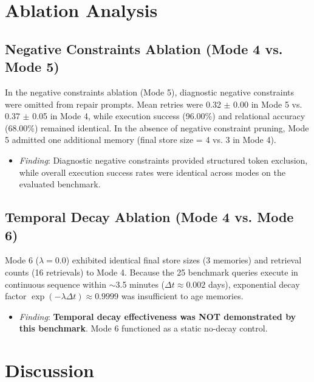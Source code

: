 \documentclass[conference]{IEEEtran}
\begin{document}
\section{Ablation Analysis}

\subsection{Negative Constraints Ablation (Mode 4 vs. Mode 5)}
In the negative constraints ablation (Mode 5), diagnostic negative constraints were omitted from repair prompts. Mean retries were 0.32 $\pm$ 0.00 in Mode 5 vs. 0.37 $\pm$ 0.05 in Mode 4, while execution success (96.00\%) and relational accuracy (68.00\%) remained identical. In the absence of negative constraint pruning, Mode 5 admitted one additional memory (final store size = 4 vs. 3 in Mode 4).
\begin{itemize}
    \item \textit{Finding}: Diagnostic negative constraints provided structured token exclusion, while overall execution success rates were identical across modes on the evaluated benchmark.
\end{itemize}

\subsection{Temporal Decay Ablation (Mode 4 vs. Mode 6)}
Mode 6 ($\lambda = 0.0$) exhibited identical final store sizes (3 memories) and retrieval counts (16 retrievals) to Mode 4. Because the 25 benchmark queries execute in continuous sequence within $\sim$3.5 minutes ($\Delta t \approx 0.002$ days), exponential decay factor $\exp(-\lambda \Delta t) \approx 0.9999$ was insufficient to age memories.
\begin{itemize}
    \item \textit{Finding}: \textbf{Temporal decay effectiveness was NOT demonstrated by this benchmark}. Mode 6 functioned as a static no-decay control.
\end{itemize}

\section{Discussion}
\end{document}

